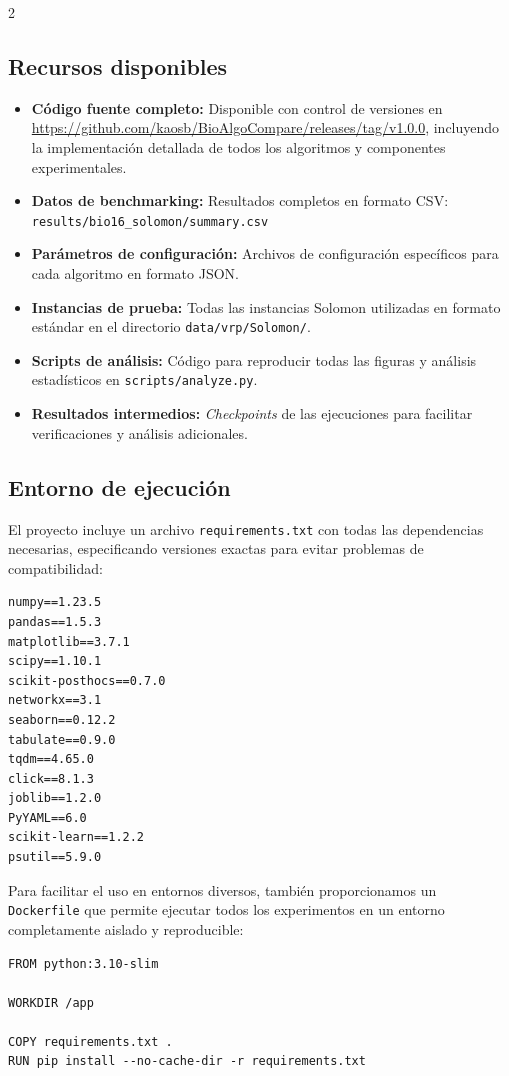 \documentclass[10pt,a4paper]{extarticle}
\begin{document}
\begin{table}[!htbp]
\begin{multicols}{2}
\subsection{Recursos disponibles}
\begin{itemize}
\item \textbf{Código fuente completo:} Disponible con control de versiones en \url{https://github.com/kaosb/BioAlgoCompare/releases/tag/v1.0.0}, incluyendo la implementación detallada de todos los algoritmos y componentes experimentales.
\item \textbf{Datos de benchmarking:} Resultados completos en formato CSV: \texttt{results/bio16_solomon/summary.csv}
\item \textbf{Parámetros de configuración:} Archivos de configuración específicos para cada algoritmo en formato JSON.
\item \textbf{Instancias de prueba:} Todas las instancias Solomon utilizadas en formato estándar en el directorio \texttt{data/vrp/Solomon/}.
\item \textbf{Scripts de análisis:} Código para reproducir todas las figuras y análisis estadísticos en \texttt{scripts/analyze.py}.
\item \textbf{Resultados intermedios:} \textit{Checkpoints} de las ejecuciones para facilitar verificaciones y análisis adicionales.
\end{itemize}

\subsection{Entorno de ejecución}
El proyecto incluye un archivo \texttt{requirements.txt} con todas las dependencias necesarias, especificando versiones exactas para evitar problemas de compatibilidad:
\begin{lstlisting}
numpy==1.23.5
pandas==1.5.3
matplotlib==3.7.1
scipy==1.10.1
scikit-posthocs==0.7.0
networkx==3.1
seaborn==0.12.2
tabulate==0.9.0
tqdm==4.65.0
click==8.1.3
joblib==1.2.0
PyYAML==6.0
scikit-learn==1.2.2
psutil==5.9.0
\end{lstlisting}

Para facilitar el uso en entornos diversos, también proporcionamos un \texttt{Dockerfile} que permite ejecutar todos los experimentos en un entorno completamente aislado y reproducible:
\begin{lstlisting}
FROM python:3.10-slim

WORKDIR /app

COPY requirements.txt .
RUN pip install --no-cache-dir -r requirements.txt


\end{lstlisting}
\end{multicols}
\end{table}
\end{document}
